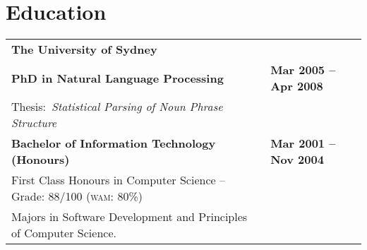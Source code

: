 \documentclass[]{article}
\begin{document}
\begin{table*}[h!]
\begin{tabular}[h!]{p{12.7cm}l}
\end{tabular}
\end{table*}

\newpage

\section*{Education}

\setlength{\tabcolsep}{0.1cm}
\begin{table*}[h!]
\begin{tabular}[h!]{p{12.7cm}l}

\textbf{The University of Sydney} & \\
\textbf{PhD in Natural Language Processing} & \textbf{Mar 2005 -- Apr 2008}\\
\hspace{0.5cm}Thesis:~\textit{Statistical Parsing of Noun Phrase Structure} & \\

\textbf{Bachelor of Information Technology (Honours)} & \textbf{Mar 2001 -- Nov 2004}\\
\hspace{0.5cm}First Class Honours in Computer Science -- Grade: 88/100 (\textsc{wam}: 80\%) & \\
\hspace{0.5cm}Majors in Software Development and Principles of Computer Science. & \\


\end{tabular}
\end{table*}
\end{document}
